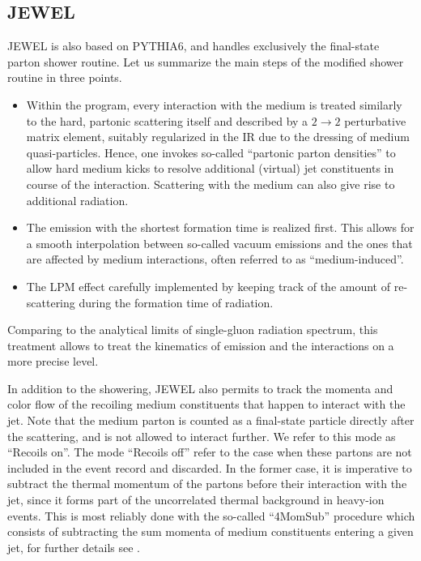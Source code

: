 \subsection{JEWEL}
\label{app:jewel}

JEWEL is also based on PYTHIA6, and handles exclusively the final-state parton shower routine. Let us summarize the main steps of the modified shower routine in three points.
\begin{itemize}

\item Within the program, every interaction with the medium is treated similarly to the hard, partonic scattering itself and described by a $2 \to 2$ perturbative matrix element, suitably regularized in the IR due to the dressing of medium quasi-particles. Hence, one invokes so-called ``partonic parton densities'' to allow hard medium kicks to resolve additional (virtual) jet constituents in course of the interaction. Scattering with the medium can also give rise to additional radiation.

\item The emission with the shortest formation time is realized first. This allows for a smooth interpolation between so-called vacuum emissions and the ones that are affected by medium interactions, often referred to as ``medium-induced''.

\item The LPM effect carefully implemented by keeping track of the amount of re-scattering during the formation time of radiation.
\end{itemize}
Comparing to the analytical limits of single-gluon radiation spectrum, this treatment allows to treat the kinematics of emission and the interactions on a more precise level.

In addition to the showering, JEWEL also permits to track the momenta and color flow of the recoiling medium constituents that happen to interact with the jet. Note that the medium parton is counted as a final-state particle directly after the scattering, and is not allowed to interact further. We refer to this mode as ``Recoils on''. The mode ``Recoils off'' refer to the case when these partons are not included in the event record and discarded. In the former case, it is imperative to subtract the thermal momentum of the partons before their interaction with the jet, since it forms part of the uncorrelated  thermal background in heavy-ion events. This is most reliably done with the so-called ``4MomSub'' procedure which consists of subtracting the sum momenta of medium constituents entering a given jet, for further details see \cite{KunnawalkamElayavalli:2017hxo}. 
